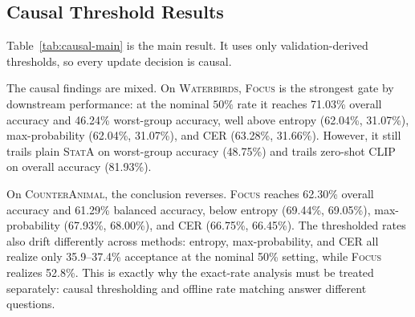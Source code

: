 \documentclass{article}
\newcommand{\focus}{\textsc{Focus}}
\newcommand{\stata}{\textsc{StatA}}
\newcommand{\wb}{\textsc{Waterbirds}}
\newcommand{\ca}{\textsc{CounterAnimal}}
\begin{document}
\subsection{Causal Threshold Results}

Table~\ref{tab:causal-main} is the main result. It uses only validation-derived thresholds, so every update decision is causal.

The causal findings are mixed. On \wb{}, \focus{} is the strongest gate by downstream performance: at the nominal $50\%$ rate it reaches 71.03\% overall accuracy and 46.24\% worst-group accuracy, well above entropy (62.04\%, 31.07\%), max-probability (62.04\%, 31.07\%), and CER (63.28\%, 31.66\%). However, it still trails plain \stata{} on worst-group accuracy (48.75\%) and trails zero-shot CLIP on overall accuracy (81.93\%).

On \ca{}, the conclusion reverses. \focus{} reaches 62.30\% overall accuracy and 61.29\% balanced accuracy, below entropy (69.44\%, 69.05\%), max-probability (67.93\%, 68.00\%), and CER (66.75\%, 66.45\%). The thresholded rates also drift differently across methods: entropy, max-probability, and CER all realize only 35.9--37.4\% acceptance at the nominal 50\% setting, while \focus{} realizes 52.8\%. This is exactly why the exact-rate analysis must be treated separately: causal thresholding and offline rate matching answer different questions.
\end{document}
